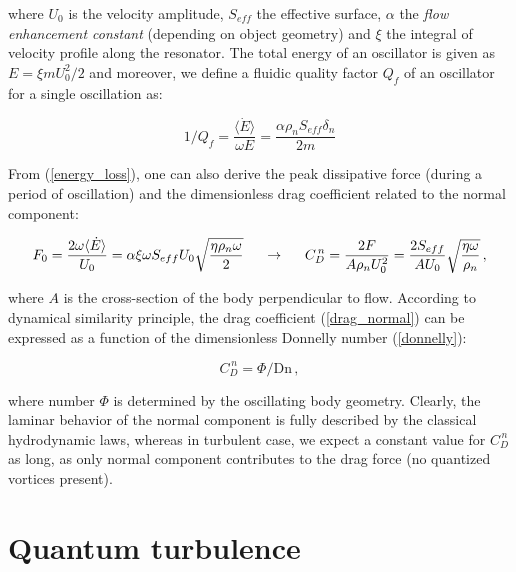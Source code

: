 where $U_0$ is the velocity amplitude, $S_{eff}$ the effective surface, $\alpha$ the \textit{flow enhancement constant} (depending on object geometry) and $\xi$ the integral of velocity profile along the resonator. The total energy of an oscillator is given as $E = \xi m U_0^2 / 2$ and moreover, we define a fluidic quality factor $Q_f$ of an oscillator for a single oscillation as:

\begin{equation}
1 / Q_f = \frac{\langle \dot{E} \rangle}{\omega E} = \frac{\alpha \rho_n S_{eff} \delta_n}{2m}
\label{quality}
\end{equation}

From (\ref{energy_loss}), one can also derive the peak dissipative force (during a period of oscillation) and the dimensionless drag coefficient related to the normal component:

\begin{equation}
F_0 = \frac{2 \omega \langle \dot{E} \rangle}{U_0}
= \alpha \xi \omega S_{eff} U_0 \sqrt{\frac{\eta \rho_n \omega}{2}}
\hspace{5mm}
\rightarrow
\hspace{5mm}
C_D^{\,n} = \frac{2 F}{A \rho_n U_0^2} = \frac{2 S_{eff}}{A U_0} \sqrt{\frac{\eta \omega}{\rho_n}}\,,
\label{drag_normal}
\end{equation}

where $A$ is the cross-section of the body perpendicular to flow. According to dynamical similarity principle, the drag coefficient (\ref{drag_normal}) can be expressed as a function of the dimensionless Donnelly number (\ref{donnelly}):

\begin{equation}
C_D^{\,n} = \Phi / \text{Dn}\,,
\end{equation}

where number $\Phi$ is determined by the oscillating body geometry. Clearly, the laminar behavior of the normal component is fully described by the classical hydrodynamic laws, whereas in turbulent case, we expect a constant value for $C_D^{\,n}$ as long, as only normal component contributes to the drag force (no quantized vortices present).


\section{Quantum turbulence}


